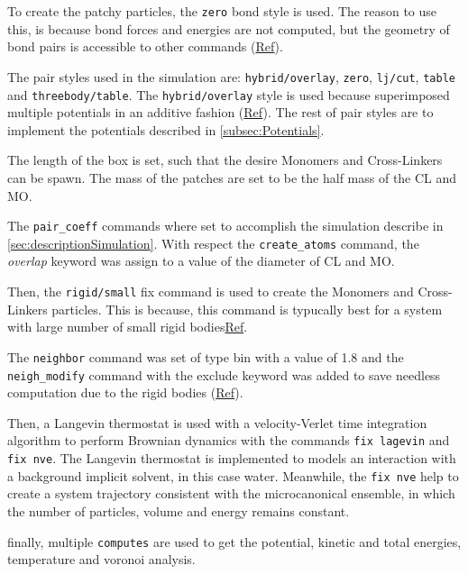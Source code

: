 \documentclass[main.tex]{subfiles}
\begin{document}
To create the patchy particles, the \verb|zero| bond style is used.
The reason to use this, is because bond forces and energies are not computed, but the geometry of bond pairs is accessible to other commands (\href{https://docs.lammps.org/bond_zero.html}{Ref}).

The pair styles used in the simulation are: \verb|hybrid/overlay|, \verb|zero|, \verb|lj/cut|, \verb|table| and \verb|threebody/table|.
The \verb|hybrid/overlay| style is used because superimposed multiple potentials in an additive fashion (\href{https://docs.lammps.org/pair_hybrid.html}{Ref}).
The rest of pair styles are to implement the potentials described in \ref{subsec:Potentials}.

The length of the box is set, such that the desire Monomers and Cross-Linkers can be spawn.
The mass of the patches are set to be the half mass of the CL and MO.

The \verb|pair_coeff| commands where set to accomplish the simulation describe in \ref{sec:descriptionSimulation}.
With respect the \verb|create_atoms| command, the \textit{overlap} keyword was assign to a value of the diameter of CL and MO.

Then, the \verb|rigid/small| fix command is used to create the Monomers and Cross-Linkers particles.
This is because, this command is typucally best for a system with large number of small rigid bodies\href{https://docs.lammps.org/fix_rigid.html}{Ref}.

The \verb|neighbor| command was set of type bin with a value of 1.8 and the \verb|neigh_modify| command with the exclude keyword was added to save needless computation due to the rigid bodies (\href{https://docs.lammps.org/neigh_modify.html}{Ref}).

Then, a Langevin thermostat is used with a velocity-Verlet time integration algorithm to perform Brownian dynamics with the commands \verb|fix lagevin| and \verb|fix nve|.
The Langevin thermostat is implemented to models an interaction with a background implicit solvent, in this case water.
Meanwhile, the \verb|fix nve| help to create a system trajectory consistent with the microcanonical ensemble, in which the number of particles, volume and energy remains constant.

finally, multiple \verb|computes| are used to get the potential, kinetic and total energies, temperature and voronoi analysis.
\end{document}
